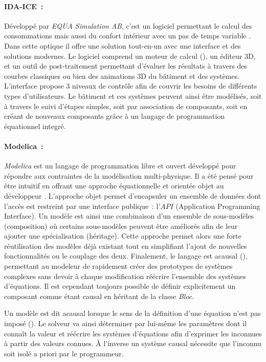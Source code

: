 \paragraph{IDA-ICE~:} %
\label{par:ida_ice}
Développé par \textit{EQUA Simulation AB}, c’est un logiciel permettant le calcul des
consommations mais aussi du confort intérieur avec un pas de temps variable
\parencite{Kalamees2004}. Dans cette optique il offre une solution tout-en-un avec une
interface et des solutions modernes. Le logiciel comprend un moteur de calcul (),
un éditeur $3$D, et un outil de post-traitement permettant d’évaluer les résultats à
travers des courbes classiques ou bien des animations $3$D du bâtiment et des systèmes.
L’interface propose $3$ niveaux de contrôle afin de couvrir les besoins de différents
types d’utilisateurs. Le bâtiment et ces systèmes peuvent ainsi être modélisés, soit à
travers le suivi d’étapes simples, soit par association de composants, soit en créant de nouveaux
composants grâce à un langage de programmation équationnel integré.

\paragraph{Modelica~:} %
\label{par:modelica_}
\textit{Modelica} est un langage de programmation libre et ouvert
développé pour répondre aux contraintes de la modélisation multi-physique. Il a été pensé
pour être intuitif en offrant une approche équationnelle et orientée objet au développeur
\parencite{Wetter2016290}.
L’approche objet permet d’encapsuler un ensemble de données dont l’accès est restreint par
une interface publique~: l’$API$ (Application Programming Interface). Un modèle est
ainsi une combinaison d’un ensemble de sous-modèles (composition) où certains sous-modèles
peuvent être améliorés afin de leur ajouter une spécialisation (héritage). Cette
approche permet alors une forte réutilisation des modèles déjà existant tout en
simplifiant l’ajout de nouvelles fonctionnalités ou le couplage des deux. Finalement, le
langage est acausal (), permettant au modeleur de rapidement
créer des prototypes de systèmes complexes sans devoir à chaque modification réécrire
l’ensemble des systèmes d’équations. Il est cependant toujours possible de définir
explicitement un composant comme étant causal en héritant de la classe \textit{Bloc}.

\begin{Def}[Acausal]\label{def:acausal}
Un modèle est dit acausal lorsque le sens de la définition d’une équation n’est pas
imposé (). Le solveur va ainsi déterminer par lui-même les
paramètres dont il connaît la valeur et réécrire les systèmes d’équations afin d’exprimer
les inconnues à partir des valeurs connues. À l’inverse un système causal nécessite
que l’inconnu soit isolé a priori par le programmeur.
\end{Def}


